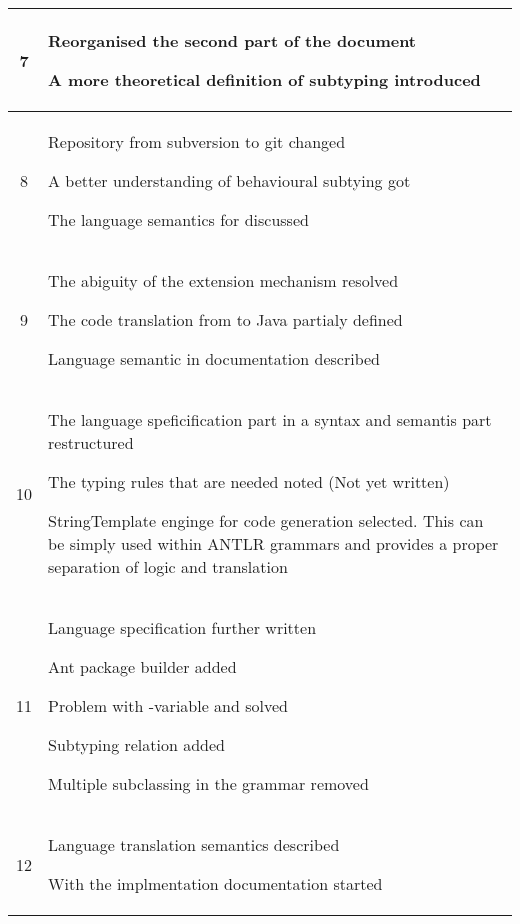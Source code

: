 \begin{center}
\begin{longtable}{|c|p{12cm}|}
7 &
\begin{journal}
	\item Reorganised the second part of the document
	\item A more theoretical definition of subtyping introduced
\end{journal}
\\ \hline
8 &
\begin{journal}
	\item Repository from subversion to git changed
	\item A better understanding of behavioural subtying got
	\item The language semantics for \mytype discussed
\end{journal}
\\ \hline
9 &
\begin{journal}
	\item The abiguity of the extension mechanism resolved
	\item The code translation from \ooplss to Java partialy defined
	\item Language semantic in documentation described
\end{journal}
\\ \hline
10 &
\begin{journal}
	\item The language speficification part in a syntax and semantis part restructured
	\item The typing rules that are needed noted (Not yet written)
	\item StringTemplate enginge for code generation selected. This can be simply used within ANTLR grammars and provides a proper separation of logic and translation
\end{journal}
\\ \hline
11 &
\begin{journal}
	\item Language specification further written
	\item Ant package builder added
	\item Problem with \self-variable and \mytype solved
	\item Subtyping relation added
	\item Multiple subclassing in the grammar removed
\end{journal}
\\ \hline
12 &
\begin{journal}
	\item Language translation semantics described
	\item With the implmentation documentation started

\end{journal}
\end{longtable}
\end{center}
